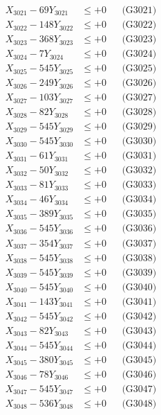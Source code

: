 \documentclass[a4paper,10pt]{article}
\begin{document}
{\begin{align}
\allowbreak
X_{3021} - 69Y_{3021} &\leq +0 && \text{(G3021)} \\
X_{3022} - 148Y_{3022} &\leq +0 && \text{(G3022)} \\
X_{3023} - 368Y_{3023} &\leq +0 && \text{(G3023)} \\
X_{3024} - 7Y_{3024} &\leq +0 && \text{(G3024)} \\
X_{3025} - 545Y_{3025} &\leq +0 && \text{(G3025)} \\
X_{3026} - 249Y_{3026} &\leq +0 && \text{(G3026)} \\
X_{3027} - 103Y_{3027} &\leq +0 && \text{(G3027)} \\
X_{3028} - 82Y_{3028} &\leq +0 && \text{(G3028)} \\
X_{3029} - 545Y_{3029} &\leq +0 && \text{(G3029)} \\
X_{3030} - 545Y_{3030} &\leq +0 && \text{(G3030)} \\
\allowbreak
X_{3031} - 61Y_{3031} &\leq +0 && \text{(G3031)} \\
X_{3032} - 50Y_{3032} &\leq +0 && \text{(G3032)} \\
X_{3033} - 81Y_{3033} &\leq +0 && \text{(G3033)} \\
X_{3034} - 46Y_{3034} &\leq +0 && \text{(G3034)} \\
X_{3035} - 389Y_{3035} &\leq +0 && \text{(G3035)} \\
X_{3036} - 545Y_{3036} &\leq +0 && \text{(G3036)} \\
X_{3037} - 354Y_{3037} &\leq +0 && \text{(G3037)} \\
X_{3038} - 545Y_{3038} &\leq +0 && \text{(G3038)} \\
X_{3039} - 545Y_{3039} &\leq +0 && \text{(G3039)} \\
X_{3040} - 545Y_{3040} &\leq +0 && \text{(G3040)} \\
\allowbreak
X_{3041} - 143Y_{3041} &\leq +0 && \text{(G3041)} \\
X_{3042} - 545Y_{3042} &\leq +0 && \text{(G3042)} \\
X_{3043} - 82Y_{3043} &\leq +0 && \text{(G3043)} \\
X_{3044} - 545Y_{3044} &\leq +0 && \text{(G3044)} \\
X_{3045} - 380Y_{3045} &\leq +0 && \text{(G3045)} \\
X_{3046} - 78Y_{3046} &\leq +0 && \text{(G3046)} \\
X_{3047} - 545Y_{3047} &\leq +0 && \text{(G3047)} \\
X_{3048} - 536Y_{3048} &\leq +0 && \text{(G3048)} \\

\end{align}}
\end{document}
